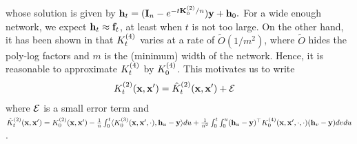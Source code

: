 whose solution is given by ${\mathbf{h}}_t = ({\mathbf{I}}_n - e^{-t {{\mathbf{K}}}^{(2)}_0/n}) {\mathbf{y}} + {\mathbf{h}}_0.$
For a wide enough network, we expect ${\mathbf{h}}_t \approx {\mathbf{f}}_t$, at least when $t$ is not too large. On the other hand, it has been shown in \cite{huang2019dynamics} that ${K}^{(4)}_t$ varies at a rate of $\tilde{O}(1/m^2)$, where $\tilde O$ hides the poly-log factors and $m$ is the (minimum) width of the network. Hence, it is reasonable to approximate ${K}^{(4)}_t$ by ${K}^{(4)}_0$. This motivates us to write
\begin{align}
    \label{eq: approx_nth_full}
	\KK_t(\rvx, \rvx') & = \hat{K}^{(2)}_t(\rvx, \rvx') + \gE %
\end{align}
where ${\mathcal{E}}$ is a small error term and $\hat{K}^{(2)}_t({\mathbf{x}}, {\mathbf{x}}') = {K}^{(2)}_0({\mathbf{x}}, {\mathbf{x}}') -\frac{1}{n} \int_{0}^t \langle {K}^{(3)}_0({\mathbf{x}}, {\mathbf{x}}', \cdot), {\mathbf{h}}_u-{\mathbf{y}} \rangle du  + \frac{1}{n^2} \int_0^t \int_0^u ({\mathbf{h}}_u - {\mathbf{y}})^\top {K}^{(4)}_0({\mathbf{x}}, {\mathbf{x}}', \cdot, \cdot) ({\mathbf{h}}_v - {\mathbf{y}}) dvdu$.

